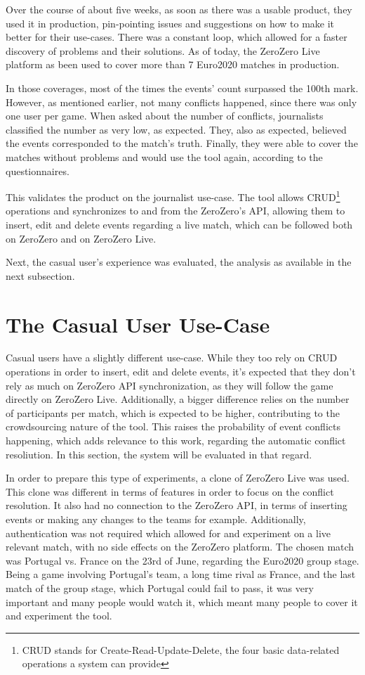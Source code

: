Over the course of about five weeks, as soon as there was a usable product, they used it in production, pin-pointing issues and suggestions on how to make it better for their use-cases. There was a constant  loop, which allowed for a faster discovery of problems and their solutions. As of today, the ZeroZero Live platform as been used to cover more than 7 Euro2020 matches in production.

In those coverages, most of the times the events' count surpassed the 100th mark. However, as mentioned earlier, not many conflicts happened, since there was only one user per game.
When asked about the number of conflicts, journalists classified the number as very low, as expected. They, also as expected, believed the events corresponded to the match's truth. Finally, they were able to cover the matches without problems and would use the tool again, according to the questionnaires.

This validates the product on the journalist use-case. The tool allows CRUD\footnote{CRUD stands for Create-Read-Update-Delete, the four basic data-related operations a system can provide} operations and synchronizes to and from the ZeroZero's API, allowing them to insert, edit and delete events regarding a live match, which can be followed both on ZeroZero and on ZeroZero Live.

Next, the casual user's experience was evaluated, the analysis as available in the next subsection.

\section{The Casual User Use-Case}

Casual users have a slightly different use-case. While they too rely on CRUD operations in order to insert, edit and delete events, it's expected that they don't rely as much on ZeroZero API synchronization, as they will follow the game directly on ZeroZero Live. Additionally, a bigger difference relies on the number of participants per match, which is expected to be higher, contributing to the crowdsourcing nature of the tool. This raises the probability of event conflicts happening, which adds relevance to this work, regarding the automatic conflict resoliution. In this section, the system will be evaluated in that regard.

In order to prepare this type of experiments, a clone of ZeroZero Live was used. This clone was different in terms of features in order to focus on the conflict resolution. It also had no connection to the ZeroZero API, in terms of inserting events or making any changes to the teams for example. Additionally, authentication was not required which allowed for and experiment on a live relevant match, with no side effects on the ZeroZero platform. The chosen match was Portugal vs. France on the 23rd of June, regarding the Euro2020 group stage. Being a game involving Portugal's team, a long time rival as France, and the last match of the group stage, which Portugal could fail to pass, it was very important and many people would watch it, which meant many people to cover it and experiment the tool.

